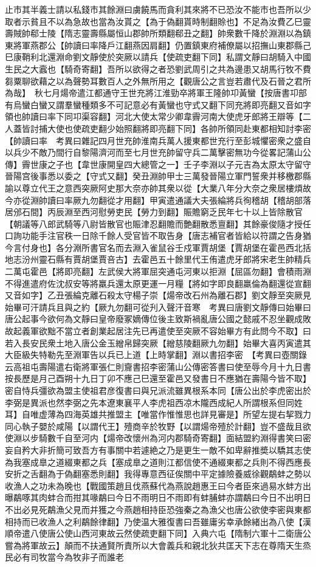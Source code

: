 止市其半義士請以私錢市其餘淵曰虜饒馬而貪利其來將不已恐汝不能市也吾所以少取者示貧且不以為急故也當為汝貰之【為于偽翻貰時制翻賒也】不足為汝費乙巳靈壽賊帥郗士陵【隋志靈壽縣屬恒山郡帥所類翻郗丑之翻】帥衆數千降於淵淵以為鎮東將軍燕郡公【帥讀曰率降戶江翻燕因肩翻】仍置鎮東府補僚屬以招撫山東郡縣己巳康鞘利北還淵命劉文靜使於突厥以請兵【使疏吏翻下同】私謂文靜曰胡騎入中國生民之大蠧也【騎奇寄翻】吾所以欲得之者恐劉武周引之共為邊患又胡馬行牧不費芻粟聊欲藉之以為聲勢耳數百人之外無所用之【觀唐公之言豈若肅代及石晉之君所為哉】　秋七月煬帝遣江都通守王世充將江淮勁卒將軍王隆帥卭黃蠻【按唐書卭部有烏蠻白蠻又謂羣蠻種類多不可記意必有黃蠻也守式又翻下同充將即亮翻又音如字領也帥讀曰率下同卭渠容翻】河北大使太常少卿韋霽河南大使虎牙郎將王辯等【二人蓋皆討捕大使也使疏吏翻少始照翻將即亮翻下同】各帥所領同赴東都相知討李密【帥讀曰率　考異曰雜記四月世充帥淮南兵萬人援東都世充行至彭城懼密衆之盛自以兵少不敵乃間行自黎陽濟河而至七月世充帥留守兵二萬擊密無功今從畧記蒲山公傳】霽世康之子也【韋世康開皇四大總管之一】壬子李淵以子元吉為太原太守留守晉陽宫後事悉以委之【守式又翻】癸丑淵帥甲士三萬發晉陽立軍門誓衆并移檄郡縣諭以尊立代王之意西突厥阿史那大奈亦帥其衆以從【大業八年分大奈之衆居樓煩故今亦從淵帥讀曰率厥九勿翻從才用翻】甲寅遣通議大夫張綸將兵徇稽胡【稽胡部落居邠石間】丙辰淵至西河慰勞吏民【勞力到翻】賑贍窮乏民年七十以上皆除散官【朝議等八郎武騎等八尉皆散官也賑津忍翻贍而艶翻散悉亶翻】其餘豪俊隨才授任口詢功能手注官秩一日除千餘人受官皆不取告身【唐志補官者皆給以符謂之告身猶今言付身也】各分淵所書官名而去淵入雀鼠谷壬戍軍賈胡堡【賈胡堡在霍邑西北括地志汾州靈石縣有賈胡堡賈咅古】去霍邑五十餘里代王侑遣虎牙郎將宋老生帥精兵二萬屯霍邑【將即亮翻】左武侯大將軍屈突通屯河東以拒淵【屈區勿翻】會積雨淵不得進遣府佐沈叔安等將羸兵還太原更運一月糧【將如字即良翻羸倫為翻還從宣翻又音如字】乙丑張綸克離石殺太守楊子崇【煬帝改石州為離石郡】劉文靜至突厥見始畢可汗請兵且與之約【厥九勿翻可從刋入聲汗音寒　考異曰唐劉文靜傳曰始畢曰唐公起事今欲何為文靜曰皇帝廢冢嫡傳位後主致斯禍亂唐公國之懿戚不忍坐觀成敗故起義軍欲黜不當立者創業起居注先已再遣使至突厥不容始畢方有此問今不取】曰若入長安民衆土地入唐公金玉繒帛歸突厥【繒慈陵翻厥九勿翻】始畢大喜丙寅遣其大臣級失特勒先至淵軍告以兵已上道【上時掌翻】淵以書招李密　【考異曰壺關錄云高祖屯壽陽遣右衛將軍張仁則齎書招李密蒲山公傳密答書曰使至辱今月十九日書按長歷是月己酉朔十九日丁卯不應己巳還至霍邑又發書日不應猶在壽陽今皆不取】密自恃兵彊欲為盟主使祖君彦復書曰與兄派流雖異根系本同【唐公出於李虎密出於李弼是異派也然李弼之先本遼東襄平人李虎祖西凉木隴西成紀人所謂根系但同姓耳】自唯虚薄為四海英雄共推盟主【唯當作惟惟思也詳見審是】所望左提右挈戮力同心執子嬰於咸陽【以謂代王】殪商辛於牧野【以謂煬帝殪於計翻】豈不盛哉且欲使淵以步騎數千自至河内【煬帝改懷州為河内郡騎奇寄翻】面結盟約淵得書笑曰密妄自矜大非折簡可致吾方有事關中若遽絶之乃是更生一敵不如卑辭推奬以驕其志使為我塞成臯之道綴東都之兵【塞成臯之道則江都信使不通綴東都之兵則不得西應長安折之舌翻為于偽翻塞悉則翻】我得專意西征俟關中平定據險養威徐觀鷸蚌之勢以收漁人之功未為晚也【戰國策趙且伐燕蘇代為燕說趙惠王曰今者臣來過易水蚌方出曝鷸啄其肉蚌合而拑其喙鷸曰今日不雨明日不雨即有蚌脯蚌亦謂鷸曰今日不出明日不出必見死鷸漁父見而并獲之今燕趙相持臣恐強秦之為漁父也唐公欲使李密與東都相持而已收漁人之利鷸餘律翻】乃使温大雅復書曰吾雖庸劣幸承餘緒出為八使【漢順帝遣八使唐公使山西河東故云然使疏吏翻下同】入典六屯【隋制六軍十二衛唐公嘗為將軍故云】顛而不扶通賢所責所以大會義兵和親北狄共匡天下志在尊隋天生烝民必有司牧當今為牧非子而誰老